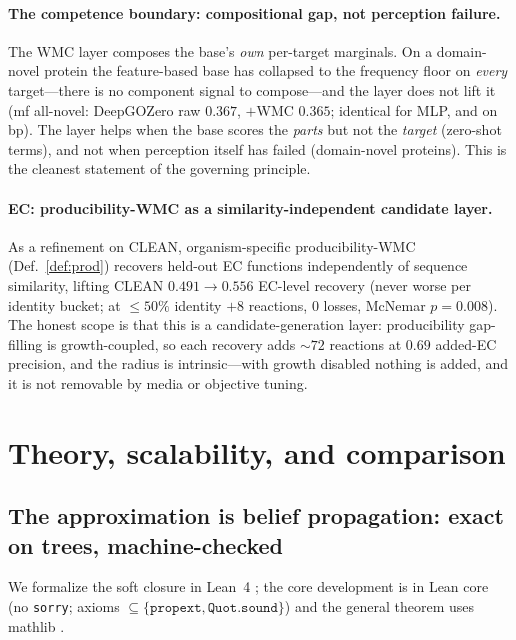 \documentclass[11pt]{article}
\begin{document}
\paragraph{The competence boundary: compositional gap, not perception failure.}
The WMC layer composes the base's \emph{own} per-target marginals. On a domain-novel protein the
feature-based base has collapsed to the frequency floor on \emph{every} target---there is no
component signal to compose---and the layer does not lift it (mf all-novel: DeepGOZero raw
$0.367$, $+$WMC $0.365$; identical for MLP, and on bp). The layer helps when the base scores the
\emph{parts} but not the \emph{target} (zero-shot terms), and not when perception itself has
failed (domain-novel proteins). This is the cleanest statement of the governing principle.

\paragraph{EC: producibility-WMC as a similarity-independent candidate layer.}
As a refinement on CLEAN, organism-specific producibility-WMC (Def.~\ref{def:prod}) recovers
held-out EC functions independently of sequence similarity, lifting CLEAN $0.491\!\to\!0.556$
EC-level recovery (never worse per identity bucket; at ${\le}50\%$ identity $+8$ reactions, $0$
losses, McNemar $p=0.008$). The honest scope is that this is a candidate-generation layer:
producibility gap-filling is growth-coupled, so each recovery adds ${\sim}72$ reactions at $0.69$
added-EC precision, and the radius is intrinsic---with growth disabled nothing is added, and it is
not removable by media or objective tuning.

\section{Theory, scalability, and comparison}\label{sec:theory}
\subsection{The approximation is belief propagation: exact on trees, machine-checked}\label{sec:theory-lean}
We formalize the soft closure in Lean~4 \citep{demoura2021lean}; the core development is in Lean
core (no \texttt{sorry}; axioms $\subseteq\{\texttt{propext},\texttt{Quot.sound}\}$) and the
general theorem uses mathlib \citep{mathlib2020}.
\end{document}
